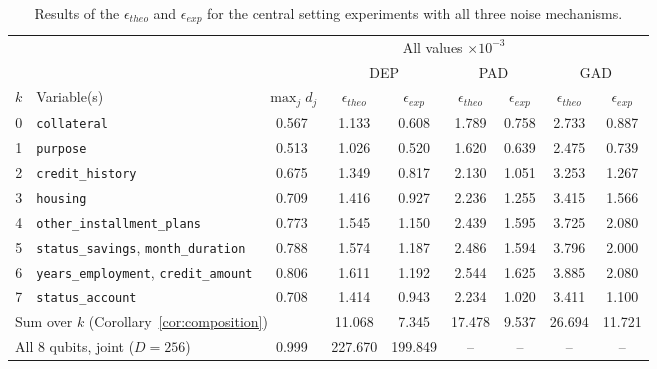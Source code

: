 \documentclass{ieeeaccess}
\begin{document}
\begin{table}[!t]
  \caption{Results of the $\epsilon_{theo}$ and $\epsilon_{exp}$ for the central setting experiments with all three noise mechanisms.}
  \label{tab:central_results}
  \centering
  \begin{tabular}{clccccccc}
    \toprule
    & & \multicolumn{7}{c}{All values $\times 10^{-3}$} \\
    \cmidrule(l){3-9}
    & & & \multicolumn{2}{c}{DEP} & \multicolumn{2}{c}{PAD} & \multicolumn{2}{c}{GAD} \\
    \cmidrule(lr){4-5} \cmidrule(lr){6-7} \cmidrule(l){8-9}
    $k$ & Variable(s) & $\max_j d_j$ & $\epsilon_{theo}$ & $\epsilon_{exp}$ & $\epsilon_{theo}$ & $\epsilon_{exp}$ & $\epsilon_{theo}$ & $\epsilon_{exp}$ \\
    \midrule
    0 & \texttt{collateral}                                 & 0.567 & 1.133 & 0.608 & 1.789 & 0.758 & 2.733 & 0.887 \\
    1 & \texttt{purpose}                                    & 0.513 & 1.026 & 0.520 & 1.620 & 0.639 & 2.475 & 0.739 \\
    2 & \texttt{credit\_history}                            & 0.675 & 1.349 & 0.817 & 2.130 & 1.051 & 3.253 & 1.267 \\
    3 & \texttt{housing}                                    & 0.709 & 1.416 & 0.927 & 2.236 & 1.255 & 3.415 & 1.566 \\
    4 & \texttt{other\_installment\_plans}                  & 0.773 & 1.545 & 1.150 & 2.439 & 1.595 & 3.725 & 2.080 \\
    5 & \texttt{status\_savings}, \texttt{month\_duration}  & 0.788 & 1.574 & 1.187 & 2.486 & 1.594 & 3.796 & 2.000 \\
    6 & \texttt{years\_employment}, \texttt{credit\_amount} & 0.806 & 1.611 & 1.192 & 2.544 & 1.625 & 3.885 & 2.080 \\
    7 & \texttt{status\_account}                            & 0.708 & 1.414 & 0.943 & 2.234 & 1.020 & 3.411 & 1.100 \\
    \midrule
    \multicolumn{3}{l}{Sum over $k$ (Corollary~\ref{cor:composition})} & 11.068 & 7.345 & 17.478 & 9.537 & 26.694 & 11.721 \\
    \midrule
    \multicolumn{2}{l}{All 8 qubits, joint ($D = 256$)} & 0.999 & 227.670 & 199.849 & -- & -- & -- & -- \\
    \bottomrule
  \end{tabular}
\end{table}
\end{document}
